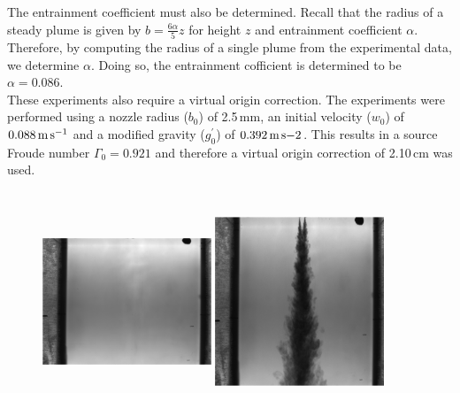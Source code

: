 \documentclass{jfm}
\begin{document}
	The entrainment coefficient must also be determined. Recall that the radius of a steady plume is given by $b = \tfrac{6\alpha}{5}z$ for height $z$ and entrainment coefficient $\alpha$. Therefore, by computing the radius of a single plume from the experimental data, we determine $\alpha$. Doing so, the entrainment cofficient is determined to be $\alpha = 0.086$. \\
	
	These experiments also require a virtual origin correction. The experiments were performed using a nozzle radius ($b_0$) of 2.5\,mm, an initial velocity ($w_0$) of $0.088\,\text{m\,s}^{-1}$ and a modified gravity ($g_0^{\prime}$) of $0.392\,\text{m\,s}{-2}$. This results in a source Froude number $\Gamma_0 = 0.921$ and therefore a virtual origin correction of 2.10\,cm was used.
	\begin{figure}
		\centering 
		\includegraphics[trim = {0cm 0cm, 0cm, 0cm}, clip,width=0.45\textwidth,height = 2.6in,angle = 180]{frame650BG.eps}
		\hspace{1em}
		\includegraphics[trim = {0 0cm 0cm 0}, clip,width=0.45\textwidth, height = 2.6in,angle = 180]{frame650.eps}
		

\end{figure}
\end{document}
